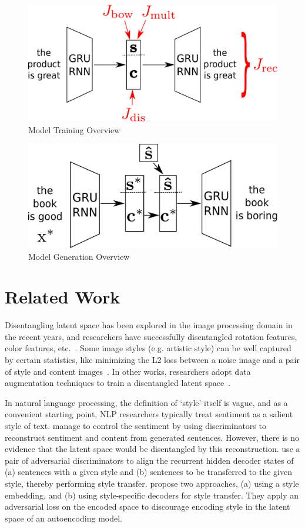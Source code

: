 \documentclass[11pt,a4paper]{article}
\begin{document}
\begin{figure}[ht]
	\centering
	\includegraphics[width=0.8\linewidth]{model-overview-training}
	\caption{Model Training Overview}
	\label{fig:model-training-overview}
\end{figure}
\begin{figure}[ht]
	\centering
	\includegraphics[width=0.8\linewidth]{model-overview-inference}
	\caption{Model Generation Overview}
	\label{fig:model-inference-overview}
\end{figure}


\section{Related Work}

Disentangling latent space has been explored in the image processing domain in the recent years, and researchers have successfully disentangled rotation features, color features, etc.~\cite{chen2016infogan,luan2017deep}. Some image styles (e.g. artistic style) can be well captured by certain statistics, like minimizing the L2 loss between a noise image and a pair of style and content images~\cite{gatys2016image}. In other works, researchers adopt data augmentation techniques to train a disentangled latent space~\cite{kulkarni2015deep,champandard2016semantic}.

In natural language processing, the definition of `style' itself is vague, and as a convenient starting point, NLP researchers typically treat sentiment as a salient style of text. \citet{hu2017toward} manage to control the sentiment by using discriminators to reconstruct sentiment and content from generated sentences. However, there is no evidence that the latent space would be disentangled by this reconstruction. \citet{shen2017style} use a pair of adversarial discriminators to align the recurrent hidden decoder states of (a) sentences with a given style and (b) sentences to be transferred to the given style, thereby performing style transfer. \citet{fu2017style} propose two approaches, (a) using a style embedding, and (b) using style-specific decoders for style transfer. They apply an adversarial loss on the encoded space to discourage encoding style in the latent space of an autoencoding model.
\end{document}
